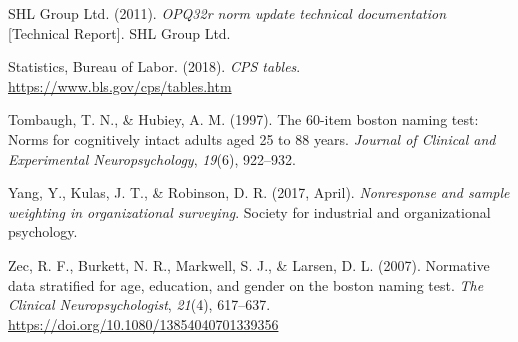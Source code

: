 \documentclass[
  ,man]{apa7}
\newlength{\cslhangindent}
\newlength{\cslentryspacingunit} %
\newenvironment{CSLReferences}[2] %
 {%
  \setlength{\parindent}{0pt}
  \ifodd #1
  \let\oldpar\par
  \def\par{\hangindent=\cslhangindent\oldpar}
  \fi
  \setlength{\parskip}{#2\cslentryspacingunit}
 }%
 {}
\begin{document}
\begin{CSLReferences}{1}{0}
\leavevmode{}%
SHL Group Ltd. (2011). \emph{OPQ32r norm update technical documentation} {[}Technical Report{]}. SHL Group Ltd.

\leavevmode{}%
Statistics, Bureau of Labor. (2018). \emph{{CPS} tables}. \url{https://www.bls.gov/cps/tables.htm}

\leavevmode{}%
Tombaugh, T. N., \& Hubiey, A. M. (1997). The 60-item boston naming test: Norms for cognitively intact adults aged 25 to 88 years. \emph{Journal of Clinical and Experimental Neuropsychology}, \emph{19}(6), 922--932.

\leavevmode{}%
Yang, Y., Kulas, J. T., \& Robinson, D. R. (2017, April). \emph{Nonresponse and sample weighting in organizational surveying}. Society for industrial and organizational psychology.

\leavevmode{}%
Zec, R. F., Burkett, N. R., Markwell, S. J., \& Larsen, D. L. (2007). Normative data stratified for age, education, and gender on the boston naming test. \emph{The Clinical Neuropsychologist}, \emph{21}(4), 617--637. \url{https://doi.org/10.1080/13854040701339356}

\end{CSLReferences}

\endgroup
\end{document}
